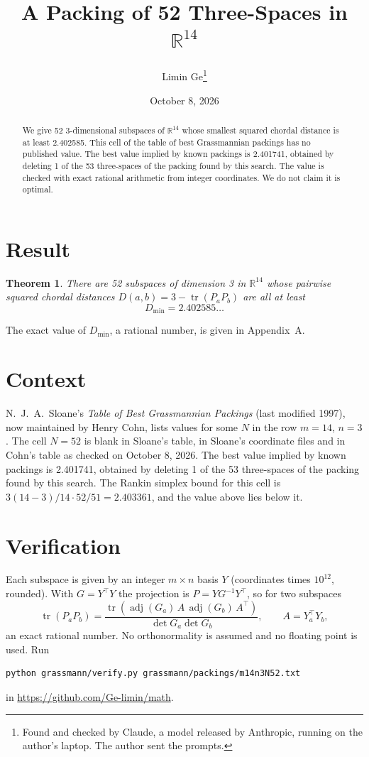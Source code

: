 \documentclass[11pt,a4paper]{article}
\title{A Packing of 52 Three-Spaces in $\mathbb{R}^{14}$}
\author{Limin Ge\thanks{Found and checked by Claude, a model released by Anthropic, running on the author's laptop. The author sent the prompts.}}
\date{October 8, 2026}
\newtheorem*{theorem}{Theorem}
\begin{document}
\maketitle
\begin{abstract}
We give 52 3-dimensional subspaces of $\mathbb{R}^{14}$ whose smallest squared chordal distance is at least 2.402585. This cell of the table of best Grassmannian packings has no published value. The best value implied by known packings is 2.401741, obtained by deleting 1 of the 53 three-spaces of the packing found by this search. The value is checked with exact rational arithmetic from integer coordinates. We do not claim it is optimal.
\end{abstract}

\section{Result}
\begin{theorem}
There are 52 subspaces of dimension 3 in $\mathbb{R}^{14}$ whose pairwise squared chordal distances $D(a,b) = 3 - \operatorname{tr}(P_aP_b)$ are all at least
\[ D_{\min} = 2.402585\ldots \]
\end{theorem}
The exact value of $D_{\min}$, a rational number, is given in Appendix~A.


\section{Context}
N.~J.~A.~Sloane's \emph{Table of Best Grassmannian Packings} (last modified 1997), now maintained by Henry Cohn, lists values for some $N$ in the row $m=14$, $n=3$. The cell $N=52$ is blank in Sloane's table, in Sloane's coordinate files and in Cohn's table as checked on October 8, 2026. The best value implied by known packings is 2.401741, obtained by deleting 1 of the 53 three-spaces of the packing found by this search. The Rankin simplex bound for this cell is $3(14-3)/14\cdot 52/51 = 2.403361$, and the value above lies below it.


\section{Verification}
Each subspace is given by an integer $m\times n$ basis $Y$ (coordinates times $10^{12}$, rounded). With $G=Y^\top Y$ the projection is $P=YG^{-1}Y^\top$, so for two subspaces
\[ \operatorname{tr}(P_aP_b)=\frac{\operatorname{tr}(\operatorname{adj}(G_a)\,A\,\operatorname{adj}(G_b)\,A^\top)}{\det G_a\det G_b},\qquad A=Y_a^\top Y_b, \]
an exact rational number. No orthonormality is assumed and no floating point is used. Run
\begin{verbatim}
python grassmann/verify.py grassmann/packings/m14n3N52.txt
\end{verbatim}
in \url{https://github.com/Ge-limin/math}.
\end{document}

